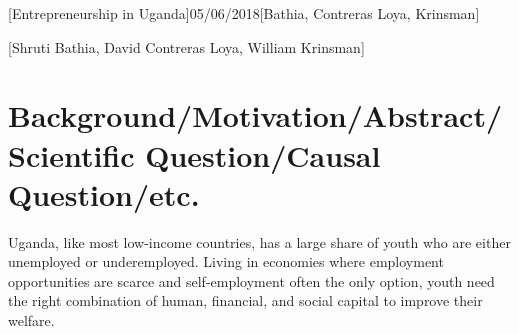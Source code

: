 






[Entrepreneurship in Uganda]{}{05/06/2018}[Bathia, Contreras Loya, Krinsman]

\newcommand{\code}[1]{\mbox{\texttt{#1}}}


\renewcommand{\thesubsection}{ \arabic{subsection}.}
\renewcommand{\thesubsubsection}{(\alph{subsubsection})}

\newcommand{\pcausal}{\probability_{U,X}}
\newcommand{\pobserved}{\probability_O}
\newcommand{\ecausal}{\expectation_{U,X}}
\newcommand{\eobserved}{\expectation_O}

\newcommand{\logistic}{\operatorname{logit}^{-1}}



[Shruti Bathia, David Contreras Loya, William Krinsman]


\section{Background/Motivation/Abstract/Scientific Question/Causal Question/etc.}
\label{cha:backgr-quest-quest}

Uganda, like most low-income countries, has a large share of youth who are either unemployed or underemployed. Living in economies where employment opportunities are scarce and self-employment often the only option, youth need the right combination of human, financial, and social capital to improve their welfare.\\

